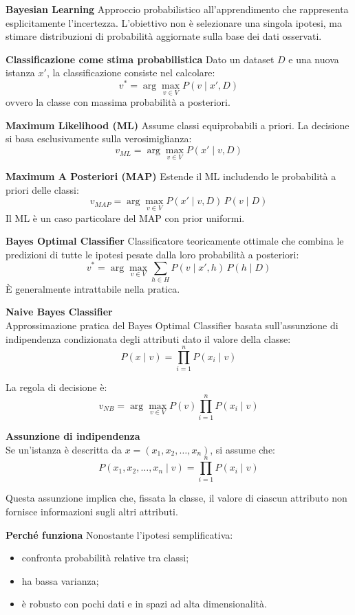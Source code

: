 \documentclass[a4paper,12pt]{report}
\begin{document}
\begin{tcolorbox}[
    colback=green!10,
    colframe=green!50!black,
    boxrule=0.4pt,
    left=6pt,
    right=6pt,
    top=6pt,
    bottom=6pt,
    breakable
]

\textbf{Bayesian Learning}  
Approccio probabilistico all’apprendimento che rappresenta esplicitamente l’incertezza.
L’obiettivo non è selezionare una singola ipotesi, ma stimare distribuzioni di probabilità aggiornate sulla base dei dati osservati.

\medskip
\textbf{Classificazione come stima probabilistica}  
Dato un dataset \( D \) e una nuova istanza \( x' \), la classificazione consiste nel calcolare:
\[
v^* = \arg\max_{v \in V} P(v \mid x', D)
\]
ovvero la classe con massima probabilità a posteriori.

\medskip
\textbf{Maximum Likelihood (ML)}  
Assume classi equiprobabili a priori.
La decisione si basa esclusivamente sulla verosimiglianza:
\[
v_{ML} = \arg\max_{v \in V} P(x' \mid v, D)
\]

\medskip
\textbf{Maximum A Posteriori (MAP)}  
Estende il ML includendo le probabilità a priori delle classi:
\[
v_{MAP} = \arg\max_{v \in V} P(x' \mid v, D)\, P(v \mid D)
\]
Il ML è un caso particolare del MAP con prior uniformi.

\medskip
\textbf{Bayes Optimal Classifier}  
Classificatore teoricamente ottimale che combina le predizioni di tutte le ipotesi pesate dalla loro probabilità a posteriori:
\[
v^* = \arg\max_{v \in V} \sum_{h \in H} P(v \mid x', h)\, P(h \mid D)
\]
È generalmente intrattabile nella pratica.

\medskip
\textbf{Naive Bayes Classifier}  \\
Approssimazione pratica del Bayes Optimal Classifier basata sull’assunzione di indipendenza condizionata degli attributi dato il valore della classe:
\[
P(x \mid v) = \prod_{i=1}^{n} P(x_i \mid v)
\]

La regola di decisione è:
\[
v_{NB} = \arg\max_{v \in V} P(v)\prod_{i=1}^{n} P(x_i \mid v)
\]

\medskip
\textbf{Assunzione di indipendenza} \\ 
Se un’istanza è descritta da \( x = (x_1, x_2, \dots, x_n) \), si assume che:
\[
P(x_1, x_2, \dots, x_n \mid v)
= \prod_{i=1}^{n} P(x_i \mid v)
\]

Questa assunzione implica che, fissata la classe, il valore di ciascun attributo non fornisce informazioni sugli altri attributi.

\medskip
\textbf{Perché funziona}  
Nonostante l’ipotesi semplificativa:
\begin{itemize}
    \item confronta probabilità relative tra classi;
    \item ha bassa varianza;
    \item è robusto con pochi dati e in spazi ad alta dimensionalità.
\end{itemize}


\end{tcolorbox}
\end{document}
